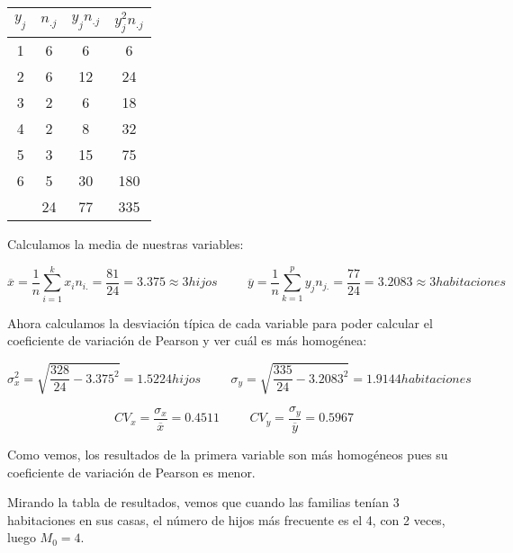 \begin{table}[h]
    \centering
    \begin{tabular}{|c|c|c|c|}
        \hline
         $y_j$ & $n_{.j}$ & $y_{j}n_{.j}$ & $y_{j}^2n_{.j}$ \\ \hline
         1 & 6 & 6 & 6 \\ \hline 
         2 & 6 & 12 & 24 \\ \hline 
         3 & 2 & 6 & 18 \\ \hline 
         4 & 2 & 8 & 32 \\ \hline 
         5 & 3 & 15 & 75 \\ \hline 
         6 & 5 & 30 & 180 \\ \hline
           & 24 & 77 & 335 \\ \hline 
    \end{tabular}
\end{table}

\subproblem
Calculamos la media de nuestras variables:

\begin{equation*}
    \overline{x} = \dfrac{1}{n} \sum_{i=1}^k x_i n_{i.} = \dfrac{81}{24} = 3.375 \approx 3 hijos
    \hspace{1cm}
    \overline{y} = \dfrac{1}{n} \sum_{k=1}^p y_j n_{j.} = \dfrac{77}{24} = 3.2083 \approx 3 habitaciones
\end{equation*}

Ahora calculamos la desviación típica de cada variable para poder calcular el coeficiente de variación de Pearson y ver cuál es más homogénea:

\begin{equation*}
    \sigma_{x}^2 = \sqrt{\dfrac{328}{24}-3.375^2} = 1.5224 hijos
    \hspace{1cm}
    \sigma_{y} = \sqrt{\dfrac{335}{24}-3.2083^2} = 1.9144 habitaciones
\end{equation*}

\begin{equation*}
    CV_{x} = \dfrac{\sigma_x}{\overline{x}} = 0.4511
    \hspace{1cm}
    CV_{y} = \dfrac{\sigma_y}{\overline{y}} = 0.5967
\end{equation*}

Como vemos, los resultados de la primera variable son más homogéneos pues su coeficiente de variación de Pearson es menor.

\subproblem
Mirando la tabla de resultados, vemos que cuando las familias tenían 3 habitaciones en sus casas, el número de hijos más frecuente es el 4, con 2 veces, luego $M_0=4$.

